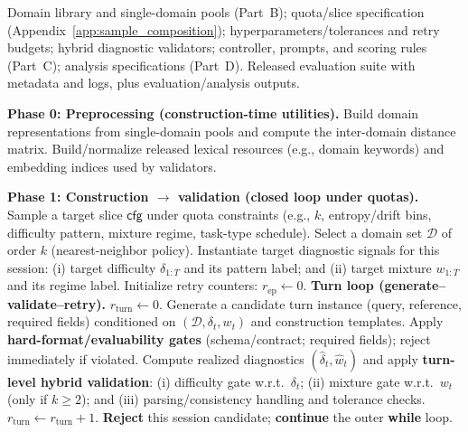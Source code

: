 \begin{algorithm}[p]
\caption{Full pipeline for \textsc{XDomainBench}: construction $\rightarrow$ validation $\rightarrow$ evaluation $\rightarrow$ analysis.}
\label{alg:end2end_pipeline}
\small
\begin{algorithmic}[1]
\Require Domain library and single-domain pools (Part~B);
quota/slice specification (Appendix~\ref{app:sample_composition});
hyperparameters/tolerances and retry budgets;
hybrid diagnostic validators;
controller, prompts, and scoring rules (Part~C);
analysis specifications (Part~D).
\Ensure Released evaluation suite with metadata and logs, plus evaluation/analysis outputs.

\Statex \textbf{Phase 0: Preprocessing (construction-time utilities).}
\State Build domain representations from single-domain pools and compute the inter-domain
distance matrix.
\State Build/normalize released lexical resources (e.g., domain keywords) and embedding indices
used by validators.

\Statex \textbf{Phase 1: Construction $\rightarrow$ validation (closed loop under quotas).}
  \State Sample a target slice $\mathsf{cfg}$ under quota constraints
  (e.g., $k$, entropy/drift bins, difficulty pattern, mixture regime, task-type schedule).
  \State Select a domain set $\mathcal{D}$ of order $k$ (nearest-neighbor policy).
  \State Instantiate target diagnostic signals for this session: (i) target difficulty $\delta_{1:T}$ and its pattern label; and (ii) target mixture $w_{1:T}$ and its regime label.
  \State Initialize retry counters: $r_{\mathrm{ep}}\leftarrow 0$.
  \Statex \hspace{-0.2em}\textbf{Turn loop (generate--validate--retry).}
    \State $r_{\mathrm{turn}}\leftarrow 0$.
    \Repeat
      \State Generate a candidate turn instance (query, reference, required fields)
      conditioned on $(\mathcal{D}, \delta_t, w_t)$ and construction templates.
      \State Apply \textbf{hard-format/evaluability gates} (schema/contract; required fields);
      reject immediately if violated.
      \State Compute realized diagnostics $(\hat{\delta}_t, \hat{w}_t)$ and apply \textbf{turn-level hybrid validation}: (i) difficulty gate w.r.t.\ $\delta_t$; (ii) mixture gate w.r.t.\ $w_t$ (only if $k\ge 2$); and (iii) parsing/consistency handling and tolerance checks.
        \State $r_{\mathrm{turn}}\leftarrow r_{\mathrm{turn}}+1$.
      \EndIf
      \State \textbf{Reject} this session candidate; \textbf{continue} the outer \textbf{while} loop.
    \EndIf
  \EndFor


\end{algorithmic}
\end{algorithm}
